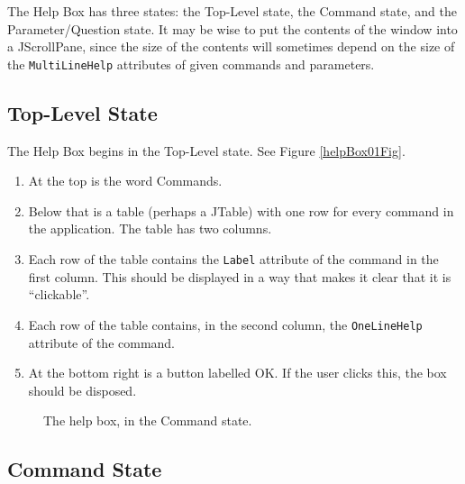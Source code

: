\documentclass[11pt]{article}
\begin{document}
The Help Box has three states: the Top-Level state, the Command state, and
the Parameter/Question state.  It may be wise to put the contents of the window
into a JScrollPane, since the size of the contents will sometimes depend
on the size of the {\tt MultiLineHelp} attributes of given commands and
parameters.

\subsection{Top-Level State}

The Help Box begins in the Top-Level state.
See Figure \ref{helpBox01Fig}.
\begin{enumerate}
\item At the top is the word Commands.
\item Below that is a table (perhaps a JTable) with one row
  for every command in the application.  The table has two columns.
\item Each row of the table contains the {\tt Label} attribute of
  the command in the first column.  This should be displayed in a
  way that makes it clear that it is ``clickable''.
\item Each row of the table contains, in the second column, the
  {\tt OneLineHelp} attribute of the command.
\item At the bottom right is a button labelled OK.  If the user
  clicks this, the box should be disposed.
\end{enumerate}

\begin{figure}

\centerline{\epsfxsize=4in }

\caption{
  The help box, in the Command state.
}
\label{helpBox02Fig}
\end{figure}

\subsection{Command State}
\end{document}
